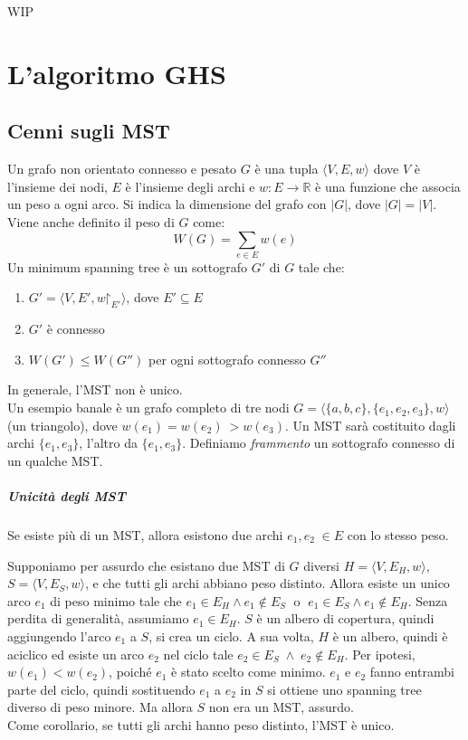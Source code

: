 \documentclass[target=bach,aauheader=,style=]{thud}
\renewcommand{\restriction}{\mathord{\upharpoonright}}
\newcommand{\eng}[1]{\foreignlanguage{english}{#1}}
\begin{document}
WIP

\chapter{L'algoritmo GHS}

\section{Cenni sugli MST}
Un grafo non orientato connesso e pesato $G$ è una tupla $\langle V,E,w\rangle$ dove $V$ è l'insieme dei nodi, $E$ è l'insieme degli archi e $w\colon E\to\mathbb{R}$ è una funzione che associa un peso a ogni arco. Si indica la dimensione del grafo con $|G|$, dove $|G|=|V|$. Viene anche definito il peso di $G$ come:
$$
W(G)=\sum_{e\in E}w(e)
$$
Un \eng{minimum spanning tree} è un sottografo $G'$ di $G$ tale che:
\begin{enumerate}
  \item $G'=\langle V,E',w\restriction_{E'}\rangle$, dove $E'\subseteq E$
  \item $G'$ è connesso
  \item $W(G')\leq W(G'')$ per ogni sottografo connesso $G''$
\end{enumerate}
In generale, l'MST non è unico.\\
Un esempio banale è un grafo completo di tre nodi $G=\langle\{a,b,c\},\{e_1,e_2,e_3\},w\rangle$ (un triangolo), dove $w(e_1)=w(e_2)\:>w(e_3)$. Un MST sarà costituito dagli archi $\{e_1, e_3\}$, l'altro da $\{e_1, e_3\}$. Definiamo \emph{frammento} un sottografo connesso di un qualche MST.

\paragraph{Unicità degli MST}\label{mst:uniqueness}
Se esiste più di un MST, allora esistono due archi $e_1,e_2\;\in E$ con lo stesso peso.

Supponiamo per assurdo che esistano due MST di $G$ diversi $H=\langle V,E_H,w\rangle$, $S=\langle V,E_S,w\rangle$, e che tutti gli archi abbiano peso distinto. Allora esiste un unico arco $e_1$ di peso minimo tale che $e_1\in E_H\land e_1\notin E_S\;$ o $\;e_1\in E_S\land e_1\notin E_H$. Senza perdita di generalità, assumiamo $e_1\in E_H$. $S$ è un albero di copertura, quindi aggiungendo l'arco $e_1$ a $S$, si crea un ciclo. A sua volta, $H$ è un albero, quindi è aciclico ed esiste un arco $e_2$ nel ciclo tale $e_2\in E_S\;\land\;e_2\notin E_H$. Per ipotesi, $w(e_1)<w(e_2)$, poiché $e_1$ è stato scelto come minimo. $e_1$ e $e_2$ fanno entrambi parte del ciclo, quindi sostituendo $e_1$ a $e_2$ in $S$ si ottiene uno \eng{spanning tree} diverso di peso minore. Ma allora $S$ non era un MST, assurdo.\\
Come corollario, se tutti gli archi hanno peso distinto, l'MST è unico.
\end{document}
